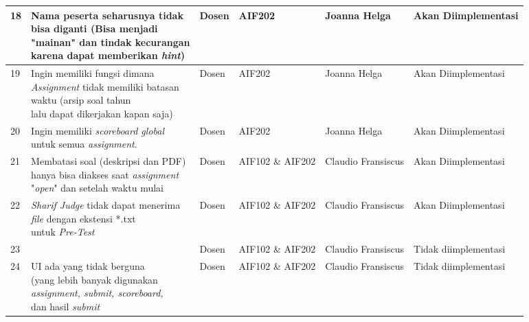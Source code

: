 \begin{table}[H]
{\begin{tabular}{|l|l|l|l|l|l|}
		18 & \makecell[l]{Nama peserta seharusnya tidak \\ bisa diganti (Bisa menjadi \\ "mainan" dan tindak kecurangan \\ karena dapat memberikan \textit{hint})} & Dosen & AIF202 & Joanna Helga & Akan Diimplementasi\\ \hline
		19 & \makecell[l]{Ingin memiliki fungsi dimana \\ \textit{Assignment} tidak memiliki batasan \\ waktu (arsip soal tahun \\ lalu dapat dikerjakan kapan saja)} & Dosen & AIF202 & Joanna Helga & Akan Diimplementasi\\ \hline
		20 & \makecell[l]{Ingin memiliki \textit{scoreboard global} \\ untuk semua \textit{assignment}.} & Dosen & AIF202 & Joanna Helga & Akan Diimplementasi\\ \hline
		21 & \makecell[l]{Membatasi soal (deskripsi dan PDF) \\ hanya bisa diakses saat \textit{assignment} \\ "\textit{open}" dan setelah waktu mulai} & Dosen & AIF102 \& AIF202 & Claudio Fransiscus & Akan Diimplementasi\\ \hline
		22 & \makecell[l]{\textit{Sharif Judge} tidak dapat menerima \\ \textit{file} dengan ekstensi *.txt \\ untuk \textit{Pre-Test}} & Dosen & AIF102 \& AIF202 & Claudio Fransiscus & Akan Diimplementasi\\ \hline
		23 & \makecell[l]{UI masih merepotkan} & Dosen & AIF102 \& AIF202 & Claudio Fransiscus & Tidak diimplementasi\\ \hline
		24 & \makecell[l]{UI ada yang tidak berguna \\ (yang lebih banyak digunakan \\ \textit{assignment, submit, scoreboard,} \\ dan hasil \textit{submit}} & Dosen & AIF102 \& AIF202 & Claudio Fransiscus & Tidak diimplementasi\\

		\hline
		
	\end{tabular}}
\end{table}

